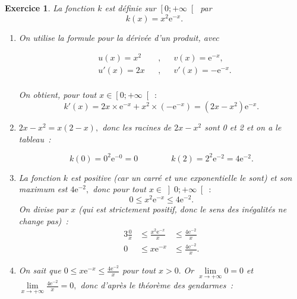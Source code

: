 \documentclass[10pt]{article}
\newtheorem{exo}{Exercice}
\begin{document}
\begin{exo}

La fonction $k$ est définie sur $\left[0;+\infty\right[$ par \[k(x)=x^2\text{e}^{-x}.\]



\begin{enumerate}
\item On utilise la formule pour la dérivée d'un produit, avec

\begin{align*}
&u(x)=x^2&&,&& v(x)=\text{e}^{-x}, \\
& u'(x)=2x&&, &&v'(x)=-\text{e}^{-x}.\\
\end{align*}


On obtient, pour tout $x\in \left[0;+\infty\right[~:$
\[k'(x)=2x\times \text{e}^{-x}+x^2\times \left(-\text{e}^{-x}\right)=\left(2x-x^2\right)\text{e}^{-x}.\]
\item $2x-x^2=x(2-x),$ donc les racines de $2x-x^2$ sont 0 et 2 et on a le tableau~:

\medskip
\begin{center}
\end{center}
\medskip

\[k(0)=0^2\text{e}^{-0}=0\qquad \qquad k(2)=2^2\text{e}^{-2}=4\text{e}^{-2}.\]

\item La fonction $k$ est positive (car un carré et une exponentielle le sont) et son maximum est $4\text{e}^{-2},$ donc pour tout $x\in\left]0;+\infty\right[~:$
\[0\leq x^2\text{e}^{-x}\leq 4\text{e}^{-2}.\] On divise par $x$ (qui est strictement positif, donc le sens des inégalités ne change pas)~:
\begin{alignat*}{3}
\frac{0}{x}&\leq \frac{x^2\text{e}^{-x}}{x}&\leq \frac{4\text{e}^{-2}}{x}\\
0&\leq x \text{e}^{-x}&\leq  \frac{4\text{e}^{-2}}{x}.
\end{alignat*}
\item On sait que $0\leq x\text{e}^{-x}\leq \frac{4\text{e}^{-2}}{x}$ pour tout $x>0.$ Or $\lim\limits_{x\to +\infty}0=0$ et $\lim\limits_{x\to +\infty}\frac{4\text{e}^{-2}}{x}=0,$ donc d'après le théorème des gendarmes~:


\end{enumerate}
\end{exo}
\end{document}
